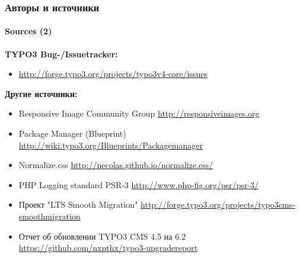 
\begin{frame}[fragile]
	\frametitle{Авторы и источники}
	\framesubtitle{Sources (2)}

	\textbf{TYPO3 Bug-/Issuetracker:}
		\begin{itemize}\smaller
			\item \url{http://forge.typo3.org/projects/typo3v4-core/issues}
		\end{itemize}

	\textbf{Другие источники:}
		\begin{itemize}\smaller

			\item Responsive Image Community Group\newline
				\url{http://responsiveimages.org}

			\item Package Manager (Blueprint)\newline
				\url{http://wiki.typo3.org/Blueprints/Packagemanager}

			\item Normalize.css\newline
				\url{http://necolas.github.io/normalize.css/}

			\item PHP Logging standard PSR-3\newline
				\url{http://www.php-fig.org/psr/psr-3/}

			\item Проект "LTS Smooth Migration"\newline
				\url{http://forge.typo3.org/projects/typo3cms-smoothmigration}

			\item Отчет об обновлении TYPO3 CMS 4.5 на 6.2
				\url{https://github.com/nxpthx/typo3-upgradereport}

		\end{itemize}

\end{frame}


